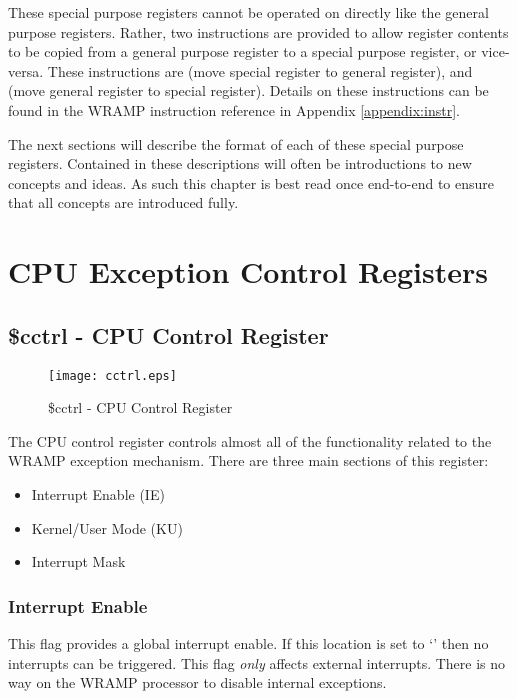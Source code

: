 These special purpose registers cannot be operated on directly like
the general purpose registers. Rather, two instructions are provided
to allow register contents to be copied from a general purpose
register to a special purpose register, or vice-versa. These
instructions are  (move special register to general
register), and  (move general register to special
register). Details on these instructions can be found in the WRAMP
instruction reference in Appendix \ref{appendix:instr}.

The next sections will describe the format of each of these special
purpose registers. Contained in these descriptions will often be
introductions to new concepts and ideas. As such this chapter is best
read once end-to-end to ensure that all concepts are introduced fully.

\section{CPU Exception Control Registers}

\subsection{\$cctrl - CPU Control Register}

\begin{figure}[h]
\begin{center}
\texttt{[image: cctrl.eps]}
\caption{\$cctrl - CPU Control Register}
\label{cctrl_pic}
\end{center}
\end{figure}

The CPU control register controls almost all of the functionality
related to the WRAMP exception mechanism. There are three main
sections of this register:

\begin{itemize}
\item Interrupt Enable (IE)
\item Kernel/User Mode (KU)
\item Interrupt Mask
\end{itemize}

\subsubsection{Interrupt Enable}

This flag provides a global interrupt enable. If this location is set
to `' then no interrupts can be triggered. This flag
\emph{only} affects external interrupts. There is no way on the WRAMP
processor to disable internal exceptions.

